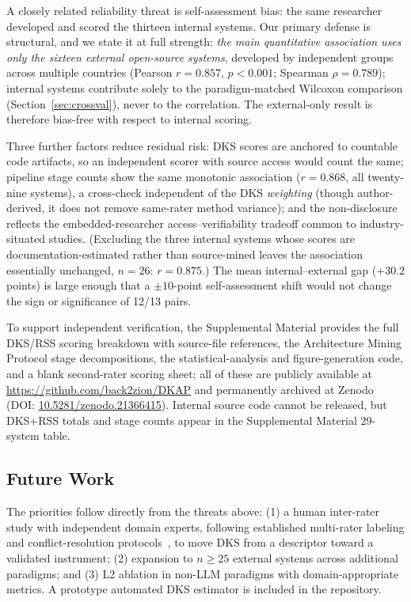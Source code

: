 \documentclass[fleqn,10pt,lineno]{wlpeerj}
\begin{document}
A closely related reliability threat is self-assessment bias: the same researcher developed and scored the thirteen internal systems. Our primary defense is structural, and we state it at full strength: \textit{the main quantitative association uses only the sixteen external open-source systems}, developed by independent groups across multiple countries (Pearson $r = 0.857$, $p < 0.001$; Spearman $\rho = 0.789$); internal systems contribute solely to the paradigm-matched Wilcoxon comparison (Section~\ref{sec:crossval}), never to the correlation. The external-only result is therefore bias-free with respect to internal scoring.

Three further factors reduce residual risk: DKS scores are anchored to countable code artifacts, so an independent scorer with source access would count the same; pipeline stage counts show the same monotonic association ($r = 0.868$, all twenty-nine systems), a cross-check independent of the DKS \textit{weighting} (though author-derived, it does not remove same-rater method variance); and the non-disclosure reflects the embedded-researcher access--verifiability tradeoff common to industry-situated studies. (Excluding the three internal systems whose scores are documentation-estimated rather than source-mined leaves the association essentially unchanged, $n=26$: $r=0.875$.) The mean internal--external gap ($+30.2$ points) is large enough that a $\pm 10$-point self-assessment shift would not change the sign or significance of 12/13 pairs.

To support independent verification, the Supplemental Material provides the full DKS/RSS scoring breakdown with source-file references, the Architecture Mining Protocol stage decompositions, the statistical-analysis and figure-generation code, and a blank second-rater scoring sheet; all of these are publicly available at \url{https://github.com/back2zion/DKAP} and permanently archived at Zenodo (DOI: \href{https://doi.org/10.5281/zenodo.21366415}{10.5281/zenodo.21366415}). Internal source code cannot be released, but DKS+RSS totals and stage counts appear in the Supplemental Material 29-system table.

\subsection{Future Work}

The priorities follow directly from the threats above: (1) a human inter-rater study with independent domain experts, following established multi-rater labeling and conflict-resolution protocols~\citep{humbatova2020taxonomy}, to move DKS from a descriptor toward a validated instrument; (2) expansion to $n \geq 25$ external systems across additional paradigms; and (3) L2 ablation in non-LLM paradigms with domain-appropriate metrics. A prototype automated DKS estimator is included in the repository.
\end{document}
